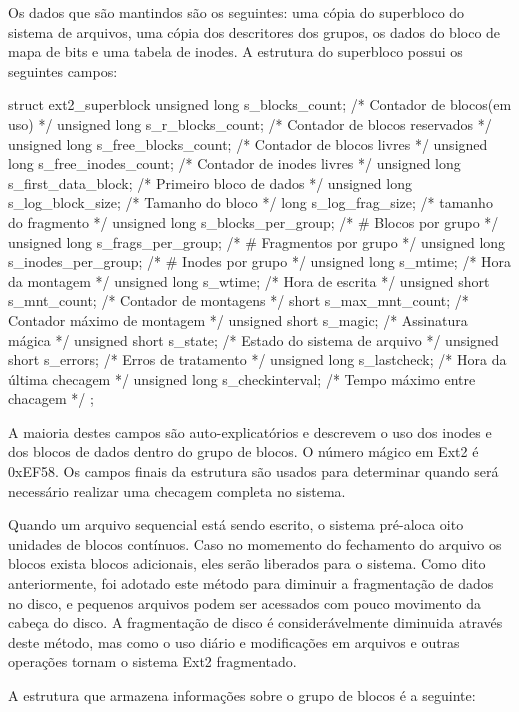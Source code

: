 Os dados que são mantindos são os seguintes: uma cópia do superbloco do sistema de arquivos, uma cópia dos descritores dos grupos, os dados do bloco de mapa de bits e uma tabela de inodes. A estrutura do superbloco possui os seguintes campos:

struct ext2_superblock {
   unsigned long  s_blocks_count;      /* Contador de blocos(em uso) */
   unsigned long  s_r_blocks_count;    /* Contador de blocos reservados */
   unsigned long  s_free_blocks_count; /* Contador de blocos livres */
   unsigned long  s_free_inodes_count; /* Contador de inodes livres */
   unsigned long  s_first_data_block;  /* Primeiro bloco de dados */
   unsigned long  s_log_block_size;    /* Tamanho do bloco */
   long           s_log_frag_size;     /* tamanho do fragmento */
   unsigned long  s_blocks_per_group;  /* # Blocos por grupo */
   unsigned long  s_frags_per_group;   /* # Fragmentos por grupo */
   unsigned long  s_inodes_per_group;  /* # Inodes por grupo */
   unsigned long  s_mtime;             /* Hora da montagem */
   unsigned long  s_wtime;             /* Hora de escrita */
   unsigned short s_mnt_count;         /* Contador de montagens */
   short          s_max_mnt_count;     /* Contador máximo de montagem */
   unsigned short s_magic;             /* Assinatura mágica */
   unsigned short s_state;             /* Estado do sistema de arquivo */
   unsigned short s_errors;            /* Erros de tratamento */
   unsigned long  s_lastcheck;         /* Hora da última checagem */
   unsigned long  s_checkinterval;     /* Tempo máximo entre chacagem */
};

A maioria destes campos são auto-explicatórios e descrevem o uso dos inodes e dos blocos de dados dentro do grupo de blocos. O número mágico em  Ext2 é 0xEF58. Os campos finais da estrutura são usados para determinar quando será necessário realizar uma checagem completa no sistema.

Quando um arquivo sequencial está sendo escrito, o sistema pré-aloca oito unidades de blocos contínuos. Caso no momemento do fechamento do arquivo os blocos exista blocos adicionais, eles serão liberados para o sistema. Como dito anteriormente, foi adotado este método para diminuir a fragmentação de dados no disco, e pequenos arquivos podem ser acessados com pouco movimento da cabeça do disco. A fragmentação de disco é considerávelmente diminuida através deste método, mas como o uso diário e modificações em arquivos e outras operações tornam o sistema Ext2 fragmentado.

A estrutura que armazena informações sobre o grupo de blocos é a seguinte:

